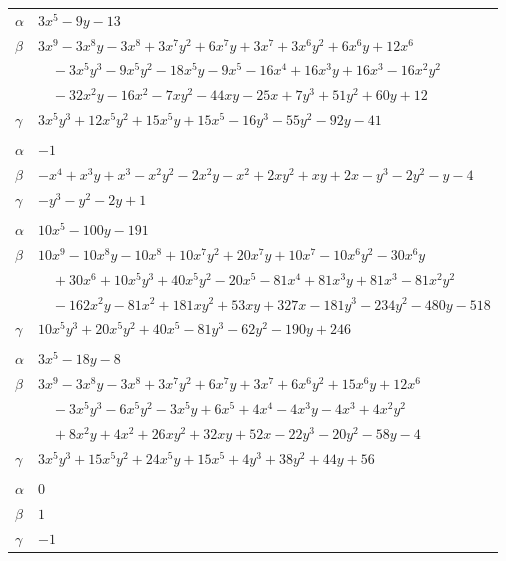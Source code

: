 \documentclass[11pt]{article}
\begin{document}
\begin{longtable}{@{}ll@{}}
$\alpha$ & $3x^{5}-9y-13$\\
$\beta$ & $3x^{9}-3x^{8}y-3x^{8}+3x^{7}y^{2}+6x^{7}y+3x^{7}+3x^{6}y^{2}+6x^{6}y+12x^{6}$\\
 & $\quad -3x^{5}y^{3}-9x^{5}y^{2}-18x^{5}y-9x^{5}-16x^{4}+16x^{3}y+16x^{3}-16x^{2}y^{2}$\\
 & $\quad -32x^{2}y-16x^{2}-7xy^{2}-44xy-25x+7y^{3}+51y^{2}+60y+12$\\
$\gamma$ & $3x^{5}y^{3}+12x^{5}y^{2}+15x^{5}y+15x^{5}-16y^{3}-55y^{2}-92y-41$\\
\addlinespace[3pt]
\multicolumn{2}{@{}l}{$\{i,j\}=\{7,30\}$, $k_{ij}=2^{2}$}\\
$\alpha$ & $-1$\\
$\beta$ & $-x^{4}+x^{3}y+x^{3}-x^{2}y^{2}-2x^{2}y-x^{2}+2xy^{2}+xy+2x-y^{3}-2y^{2}-y-4$\\
$\gamma$ & $-y^{3}-y^{2}-2y+1$\\
\addlinespace[3pt]
\multicolumn{2}{@{}l}{$\{i,j\}=\{7,32\}$, $k_{ij}=3^{2}\cdot 7\cdot 13$}\\
$\alpha$ & $10x^{5}-100y-191$\\
$\beta$ & $10x^{9}-10x^{8}y-10x^{8}+10x^{7}y^{2}+20x^{7}y+10x^{7}-10x^{6}y^{2}-30x^{6}y$\\
 & $\quad +30x^{6}+10x^{5}y^{3}+40x^{5}y^{2}-20x^{5}-81x^{4}+81x^{3}y+81x^{3}-81x^{2}y^{2}$\\
 & $\quad -162x^{2}y-81x^{2}+181xy^{2}+53xy+327x-181y^{3}-234y^{2}-480y-518$\\
$\gamma$ & $10x^{5}y^{3}+20x^{5}y^{2}+40x^{5}-81y^{3}-62y^{2}-190y+246$\\
\addlinespace[3pt]
\multicolumn{2}{@{}l}{$\{i,j\}=\{7,39\}$, $k_{ij}=2^{2}\cdot 13$}\\
$\alpha$ & $3x^{5}-18y-8$\\
$\beta$ & $3x^{9}-3x^{8}y-3x^{8}+3x^{7}y^{2}+6x^{7}y+3x^{7}+6x^{6}y^{2}+15x^{6}y+12x^{6}$\\
 & $\quad -3x^{5}y^{3}-6x^{5}y^{2}-3x^{5}y+6x^{5}+4x^{4}-4x^{3}y-4x^{3}+4x^{2}y^{2}$\\
 & $\quad +8x^{2}y+4x^{2}+26xy^{2}+32xy+52x-22y^{3}-20y^{2}-58y-4$\\
$\gamma$ & $3x^{5}y^{3}+15x^{5}y^{2}+24x^{5}y+15x^{5}+4y^{3}+38y^{2}+44y+56$\\
\addlinespace[3pt]
\multicolumn{2}{@{}l}{$\{i,j\}=\{8,13\}$, $k_{ij}=3$}\\
$\alpha$ & $0$\\
$\beta$ & $1$\\
$\gamma$ & $-1$\\

\end{longtable}
\end{document}
